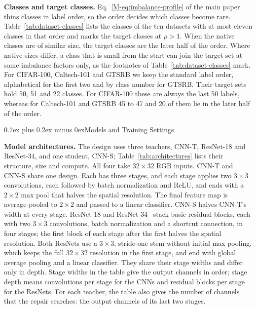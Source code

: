 \documentclass[10pt,journal,compsoc]{IEEEtran}
\makeatletter
\def\section{\@startsection{section}{1}{\z@}{-3.5ex plus -0.5ex minus -1.5ex}%
{0.7ex plus 0.2ex minus 0ex}{\normalfont\sublargesize\sffamily\bfseries\scshape}}
\theoremstyle{definition}
\makeatother
\begin{document}
\textbf{Classes and target classes.}
Eq.~\eqref{M-eq:imbalance-profile} of the main paper thins classes in label order, so the
order decides which classes become rare.
Table~\ref{tab:dataset-classes} lists the classes of the ten datasets
with at most eleven classes in that order and marks the target classes
at $\rho>1$. When the native classes are of similar size, the target
classes are the later half of the order. Where native sizes differ, a
class that is small from the start can join the target set at some
imbalance factors only, as the footnotes of
Table~\ref{tab:dataset-classes} mark. For CIFAR-100, Caltech-101
and GTSRB we keep the standard label order, alphabetical for the first
two and by class number for GTSRB.
Their target sets hold 50, 51 and 22 classes. For CIFAR-100 these are
always the last 50 labels, whereas for Caltech-101 and GTSRB 45 to 47
and 20 of them lie in the later half of the order.

\section{Models and Training Settings}
\label{supp:training}

\textbf{Model architectures.} The design uses three teachers, CNN-T,
ResNet-18 and ResNet-34, and one student, CNN-S;
Table~\ref{tab:architectures} lists their structure, size and
compute. All four take $32\times32$ RGB inputs. CNN-T and CNN-S share
one design. Each has three stages, and each stage applies two
$3\times3$ convolutions, each followed by batch normalization and
ReLU, and ends with a $2\times2$ max pool that halves the spatial
resolution. The final feature map is average-pooled to $2\times2$ and
passed to a linear classifier. CNN-S halves CNN-T's width at every
stage. ResNet-18 and ResNet-34~\cite{he2016deep} stack basic residual
blocks, each with two $3\times3$ convolutions, batch normalization and
a shortcut connection, in four stages; the first block of each stage
after the first halves the spatial resolution. Both ResNets use a
$3\times3$, stride-one stem without initial max pooling, which keeps
the full $32\times32$ resolution in the first stage, and end with
global average pooling and a linear classifier. They share their
stage widths and differ only in depth. Stage widths in the table give
the output channels in order; stage depth means convolutions per stage
for the CNNs and residual blocks per stage for the ResNets. For each
teacher, the table also gives the number of channels that the repair
searches: the output channels of its last two stages.
\end{document}
